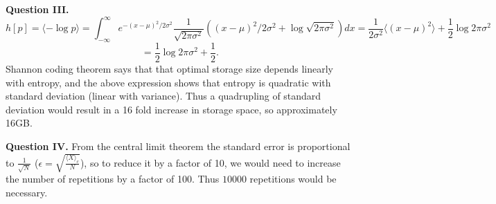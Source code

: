 \documentclass[letterpaper, reqno,11pt]{article}
\begin{document}
{\medskip\noindent\bf Question III.} 
\[
    h[p] = \langle -\log p \rangle =\int_{-\infty}^{\infty}e^{-(x-\mu)^2 /2\sigma^2} \frac{1}{\sqrt{2\pi\sigma^2}}\left( (x-\mu)^2 /2\sigma^2+\log\sqrt{2\pi\sigma^2} \right) dx=\frac{1}{2\sigma^2}\langle (x-\mu)^2 \rangle +\frac{1}{2}\log 2\pi\sigma^2
\]
\[
=\frac{1}{2}\log 2\pi\sigma^2 + \frac{1}{2}
.\]
Shannon coding theorem says that that optimal storage size depends linearly with entropy, and the above expression shows that entropy is quadratic with standard deviation (linear with variance). Thus a quadrupling of standard deviation would result in a 16 fold increase in storage space, so approximately 16GB.

{\medskip\noindent\bf Question IV.} From the central limit theorem the standard error is proportional to $\frac{1}{\sqrt{N}}$ ($\epsilon= \sqrt{\frac{\langle X \rangle _c}{N}}$), so to reduce it by a factor of 10, we would need to increase the number of repetitions by a factor of 100. Thus $10000$ repetitions would be necessary.
\end{document}
